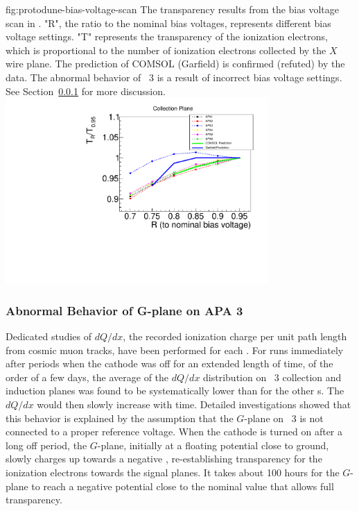 \begin{dunefigure}{fig:protodune-bias-voltage-scan}
{The transparency results from the bias voltage scan in . "R", the ratio to the nominal bias voltages, represents different bias voltage settings. "T" represents the transparency of the ionization electrons, which is proportional to the number of ionization electrons collected by the $X$ wire plane. The prediction of COMSOL (Garfield) is confirmed (refuted) by the  data. The abnormal behavior of ~3 is a result of incorrect bias voltage settings. See Section~\ref{sec:fdsp-apa-qa-g-plane} for more discussion.}
\includegraphics[width=0.75\textwidth]{graphics/protodune-bias_voltage_scan_group1.pdf}   
\end{dunefigure}

\subsubsection{Abnormal Behavior of G-plane on APA 3}
\label{sec:fdsp-apa-qa-g-plane}

Dedicated studies of $dQ/dx$, the recorded ionization charge per unit path length from cosmic muon tracks, have been performed for each . For runs immediately after periods when the cathode  was off for an extended length of time, of the order of a few days, the average of the $dQ/dx$ distribution on ~3 collection and induction planes was found to be systematically lower than for the other s.  The $dQ/dx$ would then slowly increase with time.  Detailed investigations showed that this behavior is explained by the assumption that the $G$-plane on ~3 is not connected to a proper reference voltage. When the cathode  is turned on after a long off period, the $G$-plane, initially at a floating potential close to ground, slowly charges up towards a negative ,  re-establishing transparency for the ionization electrons towards the signal planes. It takes about 100 hours for the $G$-plane to reach a negative potential close to the nominal value that allows full transparency.

